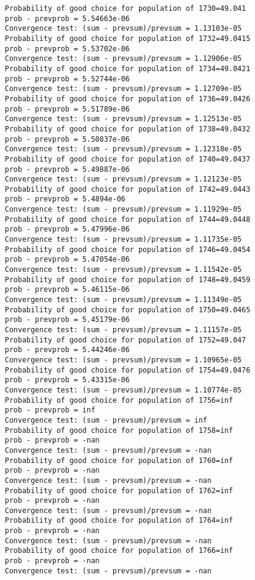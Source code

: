 \documentclass[11pt,onecolumn]{article}
\begin{document}
\begin{verbatim}
Probability of good choice for population of 1730=49.041
prob - prevprob = 5.54663e-06
Convergence test: (sum - prevsum)/prevsum = 1.13103e-05
Probability of good choice for population of 1732=49.0415
prob - prevprob = 5.53702e-06
Convergence test: (sum - prevsum)/prevsum = 1.12906e-05
Probability of good choice for population of 1734=49.0421
prob - prevprob = 5.52744e-06
Convergence test: (sum - prevsum)/prevsum = 1.12709e-05
Probability of good choice for population of 1736=49.0426
prob - prevprob = 5.51789e-06
Convergence test: (sum - prevsum)/prevsum = 1.12513e-05
Probability of good choice for population of 1738=49.0432
prob - prevprob = 5.50837e-06
Convergence test: (sum - prevsum)/prevsum = 1.12318e-05
Probability of good choice for population of 1740=49.0437
prob - prevprob = 5.49887e-06
Convergence test: (sum - prevsum)/prevsum = 1.12123e-05
Probability of good choice for population of 1742=49.0443
prob - prevprob = 5.4894e-06
Convergence test: (sum - prevsum)/prevsum = 1.11929e-05
Probability of good choice for population of 1744=49.0448
prob - prevprob = 5.47996e-06
Convergence test: (sum - prevsum)/prevsum = 1.11735e-05
Probability of good choice for population of 1746=49.0454
prob - prevprob = 5.47054e-06
Convergence test: (sum - prevsum)/prevsum = 1.11542e-05
Probability of good choice for population of 1748=49.0459
prob - prevprob = 5.46115e-06
Convergence test: (sum - prevsum)/prevsum = 1.11349e-05
Probability of good choice for population of 1750=49.0465
prob - prevprob = 5.45179e-06
Convergence test: (sum - prevsum)/prevsum = 1.11157e-05
Probability of good choice for population of 1752=49.047
prob - prevprob = 5.44246e-06
Convergence test: (sum - prevsum)/prevsum = 1.10965e-05
Probability of good choice for population of 1754=49.0476
prob - prevprob = 5.43315e-06
Convergence test: (sum - prevsum)/prevsum = 1.10774e-05
Probability of good choice for population of 1756=inf
prob - prevprob = inf
Convergence test: (sum - prevsum)/prevsum = inf
Probability of good choice for population of 1758=inf
prob - prevprob = -nan
Convergence test: (sum - prevsum)/prevsum = -nan
Probability of good choice for population of 1760=inf
prob - prevprob = -nan
Convergence test: (sum - prevsum)/prevsum = -nan
Probability of good choice for population of 1762=inf
prob - prevprob = -nan
Convergence test: (sum - prevsum)/prevsum = -nan
Probability of good choice for population of 1764=inf
prob - prevprob = -nan
Convergence test: (sum - prevsum)/prevsum = -nan
Probability of good choice for population of 1766=inf
prob - prevprob = -nan
Convergence test: (sum - prevsum)/prevsum = -nan

\end{verbatim}
\end{document}
